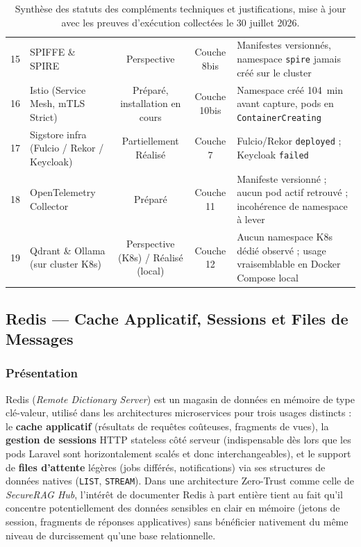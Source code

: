 \begin{table}[H]
\begin{tabularx}{\textwidth}{@{} c Z c c Z @{}}
15 & SPIFFE \& SPIRE & Perspective & Couche 8bis & Manifestes versionnés, namespace \texttt{spire} jamais créé sur le cluster \\
16 & Istio (Service Mesh, mTLS Strict) & Préparé, installation en cours & Couche 10bis & Namespace créé 104~min avant capture, pods en \texttt{ContainerCreating} \\
17 & Sigstore infra (Fulcio / Rekor / Keycloak) & Partiellement Réalisé & Couche 7 & Fulcio/Rekor \texttt{deployed} ; Keycloak \texttt{failed} \\
18 & OpenTelemetry Collector & Préparé & Couche 11 & Manifeste versionné ; aucun pod actif retrouvé ; incohérence de namespace à lever \\
19 & Qdrant \& Ollama (sur cluster K8s) & Perspective (K8s) / Réalisé (local) & Couche 12 & Aucun namespace K8s dédié observé ; usage vraisemblable en Docker Compose local \\
\bottomrule
\end{tabularx}
\caption{Synthèse des statuts des compléments techniques et justifications, mise à jour avec les preuves d'exécution collectées le 30 juillet 2026.}
\label{tab:complements_synthese_statuts}
\end{table}


\subsection{Redis — Cache Applicatif, Sessions et Files de Messages}
\label{subsec:redis_v2}

\subsubsection{Présentation}
Redis (\textit{Remote Dictionary Server}) est un magasin de données en mémoire de type clé-valeur, utilisé dans les architectures microservices pour trois usages distincts : le \textbf{cache applicatif} (résultats de requêtes coûteuses, fragments de vues), la \textbf{gestion de sessions} HTTP stateless côté serveur (indispensable dès lors que les pods Laravel sont horizontalement scalés et donc interchangeables), et le support de \textbf{files d'attente} légères (jobs différés, notifications) via ses structures de données natives (\texttt{LIST}, \texttt{STREAM}). Dans une architecture Zero-Trust comme celle de \textit{SecureRAG Hub}, l'intérêt de documenter Redis à part entière tient au fait qu'il concentre potentiellement des données sensibles en clair en mémoire (jetons de session, fragments de réponses applicatives) sans bénéficier nativement du même niveau de durcissement qu'une base relationnelle.

